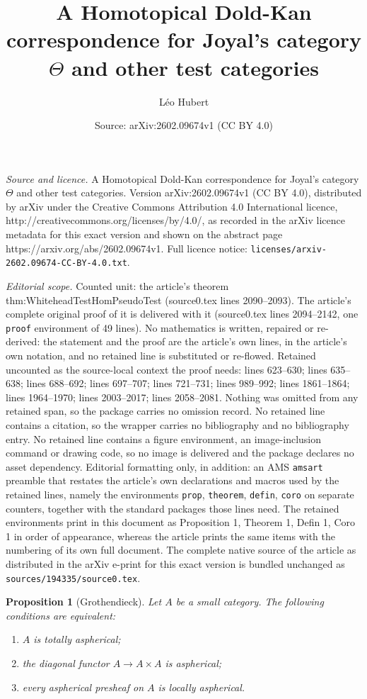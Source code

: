 \documentclass[10pt,a4paper]{amsart}
\title{A Homotopical Dold-Kan correspondence for Joyal's category $\Theta$ and other test categories}
\author{L\'eo Hubert}
\date{Source: arXiv:2602.09674v1 (CC BY 4.0)}
\newtheorem{prop}{Proposition}
\begin{document}
\maketitle

\noindent\emph{Source and licence.} A Homotopical Dold-Kan correspondence for Joyal's category $\Theta$ and other test categories. Version arXiv:2602.09674v1 (CC BY 4.0), distributed by arXiv under the Creative Commons Attribution 4.0 International licence, http://creativecommons.org/licenses/by/4.0/, as recorded in the arXiv licence metadata for this exact version and shown on the abstract page https://arxiv.org/abs/2602.09674v1. Full licence notice: \texttt{licenses/arxiv-2602.09674-CC-BY-4.0.txt}.\par\smallskip

\noindent\textit{Editorial scope.} Counted unit: the article's theorem thm:WhiteheadTestHomPseudoTest (source0.tex lines 2090--2093). The article's complete original proof of it is delivered with it (source0.tex lines 2094--2142, one \texttt{proof} environment of 49 lines). No mathematics is written, repaired or re-derived: the statement and the proof are the article's own lines, in the article's own notation, and no retained line is substituted or re-flowed.  Retained uncounted as the source-local context the proof needs: lines 623--630; lines 635--638; lines 688--692; lines 697--707; lines 721--731; lines 989--992; lines 1861--1864; lines 1964--1970; lines 2003--2017; lines 2058--2081.  Nothing was omitted from any retained span, so the package carries no omission record.  No retained line contains a citation, so the wrapper carries no bibliography and no bibliography entry.  No retained line contains a figure environment, an image-inclusion command or drawing code, so no image is delivered and the package declares no asset dependency.  Editorial formatting only, in addition: an AMS \texttt{amsart} preamble that restates the article's own declarations and macros used by the retained lines, namely the environments \texttt{prop}, \texttt{theorem}, \texttt{defin}, \texttt{coro} on separate counters, together with the standard packages those lines need.  The retained environments print in this document as Proposition 1, Theorem 1, Defin 1, Coro 1 in order of appearance, whereas the article prints the same items with the numbering of its own full document.  The complete native source of the article as distributed in the arXiv e-print for this exact version is bundled unchanged as \texttt{sources/194335/source0.tex}.
\begin{prop}[Grothendieck]\label{prop:totalementAspheriqueEquivalences}
Let $A$ be a small category. The following conditions are equivalent: 
\begin{enumerate}
\item $A$ is totally aspherical;
\item the diagonal functor $A \to A \times A$ is aspherical;
\item every aspherical presheaf on $A$ is locally aspherical.
\end{enumerate}
\end{prop}
\end{document}
